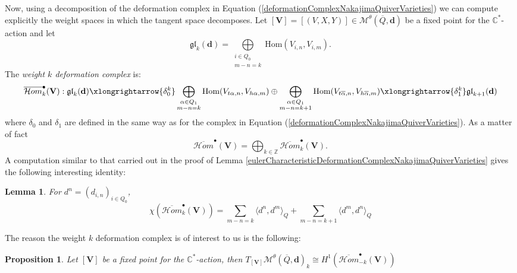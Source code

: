 \documentclass{amsart}
\theoremstyle{plain}
\newtheorem{lemma}[theorem]{Lemma}
\newtheorem{proposition}[theorem]{Proposition}
\numberwithin{equation}{section}
\theoremstyle{definition}
\theoremstyle{remark}
\begin{document}
	Now, using a decomposition of the deformation complex in Equation (\ref{deformationComplexNakajimaQuiverVarieties}) we can compute explicitly the weight spaces in which the tangent space decomposes.  Let $[\mathbf{V}]=[(V,X,Y)]\in \mathcal{M}^\theta(\overline{Q},\mathbf{d})$ be a fixed point for the $\mathbb{C}^*$-action and let $$\mathfrak{gl}_k(\mathbf{d})=\bigoplus\limits_{\substack{i\in Q_0 \\ m-n=k}}\text{Hom}(V_{i,n},V_{i,m}).$$ The \emph{weight $k$ deformation complex} is:
	\begin{equation}\label{weightKDeformationComplexNakajimaQuiverVarieties}
		\overline{\mathcal{H}om}^\bullet_k(\mathbf{V}):\mathfrak{gl}_k(\mathbf{d})\xlongrightarrow{\delta_0^k}\bigoplus_{\substack{\alpha\in Q_1\\ m-n=k}}\text{Hom}(V_{t\alpha,n},V_{h\alpha,m})\oplus\bigoplus_{\substack{\alpha\in Q_1\\ m-n=k+1}}\text{Hom}(V_{t\overline{\alpha},n},V_{h\overline{\alpha},m})\xlongrightarrow{\delta_1^k}\mathfrak{gl}_{k+1}(\mathbf{d})
	\end{equation}
	where $\delta_0$ and $\delta_1$ are defined in the same way as for the complex in Equation (\ref{deformationComplexNakajimaQuiverVarieties}). As a matter of fact 
	\begin{equation}\label{splittingDeformationComplex}
	\overline{\mathcal{H}om}^\bullet(\mathbf{V})=\bigoplus_{k\in\mathbb{Z}}\overline{\mathcal{H}om}^\bullet_k(\mathbf{V}).
	\end{equation}
	A computation similar to that carried out in the proof of Lemma \ref{eulerCharacteristicDeformationComplexNakajimaQuiverVarieties} gives the following interesting identity:
	\begin{lemma}\label{eulerCharacteristicWeightedDeformationComplex}
		For $d^n=(d_{i,n})_{i\in Q_0}$,
		$$\chi(\overline{\mathcal{H}om}_k^\bullet(\mathbf{V}))=\sum_{m-n=k}\langle d^n,d^m\rangle_Q+\sum_{m-n=k+1}\langle d^m,d^n\rangle_Q$$ 
	\end{lemma}
	The reason the weight $k$ deformation complex is of interest to us is the following:
	\begin{proposition}
		Let $[\mathbf{V}]$ be a fixed point for the $\mathbb{C}^*$-action, then $T_{[\mathbf{V}]}\mathcal{M}^\theta(\overline{Q},\mathbf{d})_k\cong H^1(\overline{\mathcal{H}om}_{-k}^\bullet(\mathbf{V}))$
	\end{proposition}
\end{document}
